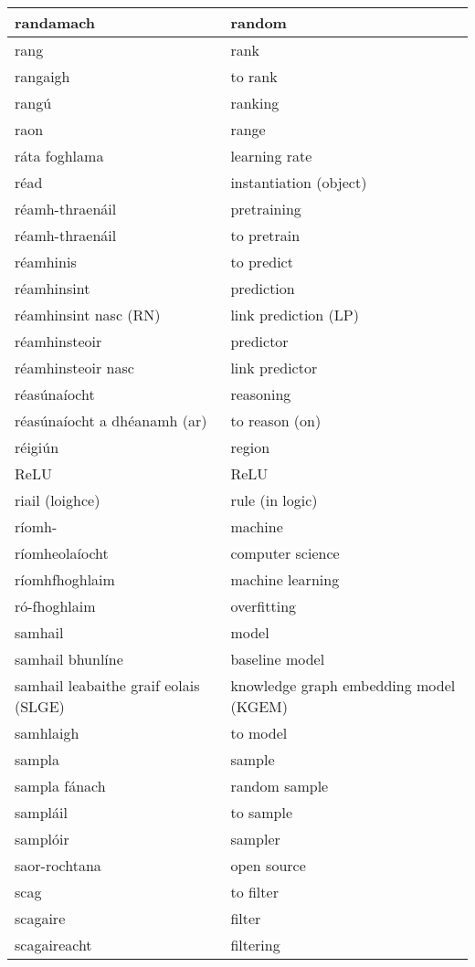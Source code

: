 \documentclass{article}
\begin{document}
\begin{longtable}{|l|l|}
		randamach&random\\ \hline 
		rang&rank\\ \hline 
		rangaigh&to rank\\ \hline 
		rangú&ranking\\ \hline 
		raon&range\\ \hline 
		ráta foghlama&learning rate\\ \hline 
		réad&instantiation (object)\\ \hline 
		réamh-thraenáil&pretraining\\ \hline 
		réamh-thraenáil&to pretrain\\ \hline 
		réamhinis&to predict\\ \hline 
		réamhinsint&prediction\\ \hline 
		réamhinsint nasc (RN)&link prediction (LP)\\ \hline 
		réamhinsteoir&predictor\\ \hline 
		réamhinsteoir nasc&link predictor\\ \hline 
		réasúnaíocht&reasoning\\ \hline 
		réasúnaíocht a dhéanamh (ar)&to reason (on)\\ \hline 
		réigiún&region\\ \hline 
		ReLU&ReLU\\ \hline 
		riail (loighce)&rule (in logic)\\ \hline 
		ríomh-&machine\\ \hline 
		ríomheolaíocht&computer science\\ \hline 
		ríomhfhoghlaim&machine learning\\ \hline 
		ró-fhoghlaim&overfitting\\ \hline 
		samhail&model\\ \hline 
		samhail bhunlíne&baseline model\\ \hline 
		samhail leabaithe graif eolais (SLGE)&knowledge graph embedding model (KGEM)\\ \hline 
		samhlaigh&to model\\ \hline 
		sampla&sample\\ \hline 
		sampla fánach&random sample\\ \hline 
		sampláil&to sample\\ \hline 
		samplóir&sampler\\ \hline 
		saor-rochtana&open source\\ \hline 
		scag&to filter\\ \hline 
		scagaire&filter\\ \hline 
		scagaireacht&filtering\\ \hline 

\end{longtable}
\end{document}
